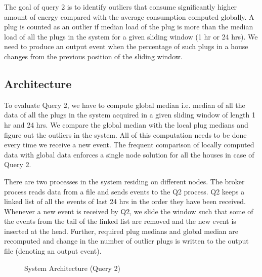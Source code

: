 The goal of query 2 is to identify outliers that consume significantly higher amount of energy compared with the average consumption computed globally. A plug is counted as an outlier if median load of the plug is more than the median load of all the plugs in the system for a given sliding window (1 hr or 24 hrs). We need to produce an output event when the percentage of such plugs in a house changes from the previous position of the sliding window. 

\subsection{Architecture}
To evaluate Query 2, we have to compute global median i.e. median of all the data of all the plugs in the system acquired in a given sliding window of length 1 hr and 24 hrs. We compare the global median with the local plug medians and figure out the outliers in the system. All of this computation needs to be done every time we receive a new event. The frequent comparison of locally computed data with global data enforces a single node solution for all the houses in case of Query 2.

There are two processes in the system residing on different nodes. The broker process reads data from a file and sends events to the Q2 process. Q2 keeps a linked list of all the events of last 24 hrs in the order they have been received. Whenever a new event is received by Q2, we slide the window such that some of the events from the tail of the linked list are removed and the new event is inserted at the head. Further, required plug medians and global median are recomputed and change in the number of outlier plugs is written to the output file (denoting an output event).

\begin{figure}[h]
\begin{center}
\caption{System Architecture (Query 2)}
\end{center}
\end{figure}
\vspace*{-0.3cm}

